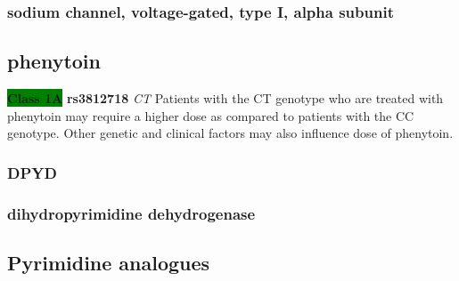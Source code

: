 \documentclass{book}
\begin{document}
\subsubsection{ sodium channel, voltage-gated, type I, alpha subunit }

\subsection{ phenytoin }


\begin{center}



\textbf{\colorbox{green} {Class 1A}} \textbf{ rs3812718 } \textit{ CT }
Patients with the CT genotype who are treated with phenytoin may require a higher dose as compared to patients with the CC genotype. Other genetic and clinical factors may also influence dose of phenytoin.

\end{center}


































\subsubsection{ DPYD }
\subsubsection{ dihydropyrimidine dehydrogenase }

\subsection{ Pyrimidine analogues }
\end{document}
